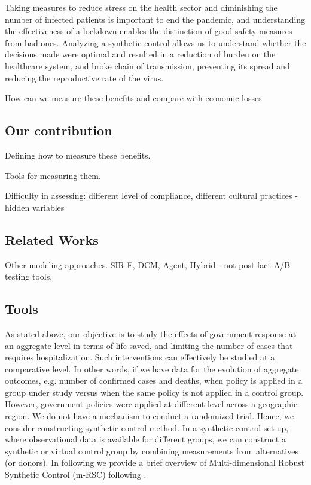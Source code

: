 \documentclass[preprint,authoryear,12pt]{elsarticle}
\begin{document}
	Taking measures to reduce stress on the health sector and diminishing the number of infected patients is important to end the pandemic, and understanding the effectiveness of a lockdown enables the distinction of good safety measures from bad ones. Analyzing a synthetic control allows us to understand whether the decisions made were optimal and resulted in a reduction of burden on the healthcare system, and broke chain of transmission, preventing its spread and reducing the reproductive rate of the virus.
	
	How can we measure these benefits and compare with economic losses
	
	\subsection{Our contribution}
	Defining how to measure these benefits.
	
	Tools for measuring them.
	
	
	Difficulty in assessing: different level of compliance, different cultural practices - hidden variables
	
	\subsection{Related Works}
	Other modeling approaches. SIR-F, DCM, Agent, Hybrid - not post fact A/B testing tools.
	
	\subsection{Tools}
	As stated above, our objective is to study the effects of government response at an aggregate level in terms of life saved, and limiting the number of cases that requires hospitalization. Such interventions can effectively be studied at a comparative level. In other words, if we have data for the evolution of aggregate outcomes, e.g. number of confirmed cases and deaths, when policy is applied in a group under study versus when the same policy is not applied in a control group. However, government policies were applied at different level across a geographic region.  We do not have a mechanism to conduct a randomized trial. Hence, we consider constructing synthetic control method\cite{ap08746, JMLR18, AMSS19}. In a synthetic control set up, where observational data is available for different groups, we can construct a synthetic or virtual control group by combining measurements from alternatives (or donors). In following we provide a brief overview of Multi-dimensional Robust Synthetic Control (m-RSC) following \cite{AMSS19}.\par
	
\end{document}
